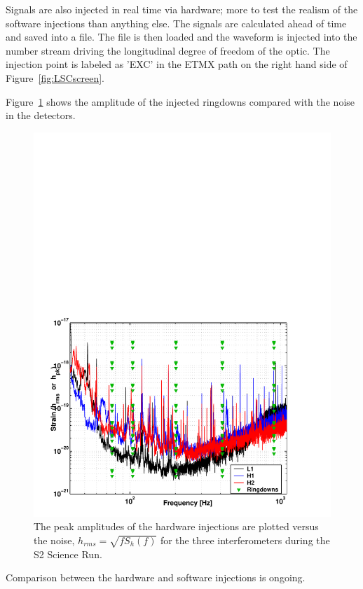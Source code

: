Signals are also injected in real time via hardware; more to test the realism of the
software injections than anything else. The signals are calculated ahead
of time and saved into a file. The file is then loaded and the waveform is
injected into the number stream driving the longitudinal degree of freedom
of the optic. The injection point is labeled as 'EXC' in the ETMX path on 
the right hand side of Figure~\ref{fig:LSCscreen}.

Figure~\ref{fig:strainer} shows the amplitude of the injected ringdowns
compared with the noise in the detectors.

\begin{figure}[!h]
\centerline{\includegraphics[angle=0,width=6.5in]{Figures/Chap7/strainer.pdf}}
\caption[Injection Amplitudes]{The peak amplitudes of the hardware injections
         are plotted versus the noise, $h_{rms} = \sqrt{f S_h(f)}$ for the 
         three interferometers during the S2 Science Run.}
\label{fig:strainer}
\end{figure}
Comparison between the hardware and software injections is ongoing.


